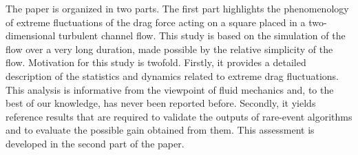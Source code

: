 \documentclass{jfm}
\newcommand{\EL}[1]{{\color{myred}{#1}}}
\begin{document}
%
%
%
%

The paper is organized in two parts. The first part highlights the phenomenology of extreme fluctuations of the drag force acting on a square placed in a two-dimensional turbulent channel flow. This study is based on the simulation of the flow over a very long duration, made possible by the relative simplicity of the flow.
%
Motivation for this study is twofold.
Firstly, it provides a detailed description of the statistics and dynamics related to extreme drag fluctuations. This analysis is informative from the  viewpoint of fluid mechanics and, to the best of our knowledge, has never been reported before.
Secondly, it yields reference results that are required to validate the outputs of rare-event algorithms and to evaluate the possible gain obtained from them. This assessment is developed in the second part of the paper.
\end{document}
